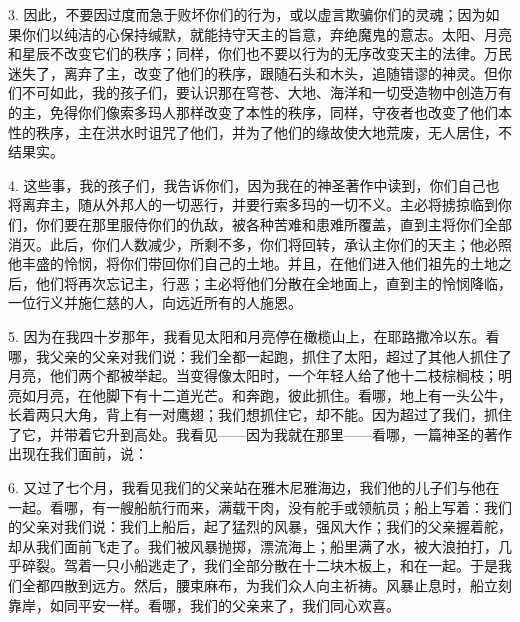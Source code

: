 3. 因此，不要因过度而急于败坏你们的行为，或以虚言欺骗你们的灵魂；因为如果你们以纯洁的心保持缄默，就能持守天主的旨意，弃绝魔鬼的意志。太阳、月亮和星辰不改变它们的秩序；同样，你们也不要以行为的无序改变天主的法律。万民迷失了，离弃了主，改变了他们的秩序，跟随石头和木头，追随错谬的神灵。但你们不可如此，我的孩子们，要认识那在穹苍、大地、海洋和一切受造物中创造万有的主，免得你们像索多玛人那样改变了本性的秩序，同样，守夜者也改变了他们本性的秩序，主在洪水时诅咒了他们，并为了他们的缘故使大地荒废，无人居住，不结果实。\par

4. 这些事，我的孩子们，我告诉你们，因为我在的神圣著作中读到，你们自己也将离弃主，随从外邦人的一切恶行，并要行索多玛的一切不义。主必将掳掠临到你们，你们要在那里服侍你们的仇敌，被各种苦难和患难所覆盖，直到主将你们全部消灭。此后，你们人数减少，所剩不多，你们将回转，承认主你们的天主；他必照他丰盛的怜悯，将你们带回你们自己的土地。并且，在他们进入他们祖先的土地之后，他们将再次忘记主，行恶；主必将他们分散在全地面上，直到主的怜悯降临，一位行义并施仁慈的人，向远近所有的人施恩。\par

5. 因为在我四十岁那年，我看见太阳和月亮停在橄榄山上，在耶路撒冷以东。看哪，我父亲的父亲对我们说：我们全都一起跑，抓住了太阳，超过了其他人抓住了月亮，他们两个都被举起。当变得像太阳时，一个年轻人给了他十二枝棕榈枝；明亮如月亮，在他脚下有十二道光芒。和奔跑，彼此抓住。看哪，地上有一头公牛，长着两只大角，背上有一对鹰翅；我们想抓住它，却不能。因为超过了我们，抓住了它，并带着它升到高处。我看见——因为我就在那里——看哪，一篇神圣的著作出现在我们面前，说：\par

6. 又过了七个月，我看见我们的父亲站在雅木尼雅海边，我们他的儿子们与他在一起。看哪，有一艘船航行而来，满载干肉，没有舵手或领航员；船上写着：我们的父亲对我们说：我们上船后，起了猛烈的风暴，强风大作；我们的父亲握着舵，却从我们面前飞走了。我们被风暴抛掷，漂流海上；船里满了水，被大浪拍打，几乎碎裂。驾着一只小船逃走了，我们全部分散在十二块木板上，和在一起。于是我们全都四散到远方。然后，腰束麻布，为我们众人向主祈祷。风暴止息时，船立刻靠岸，如同平安一样。看哪，我们的父亲来了，我们同心欢喜。\par

